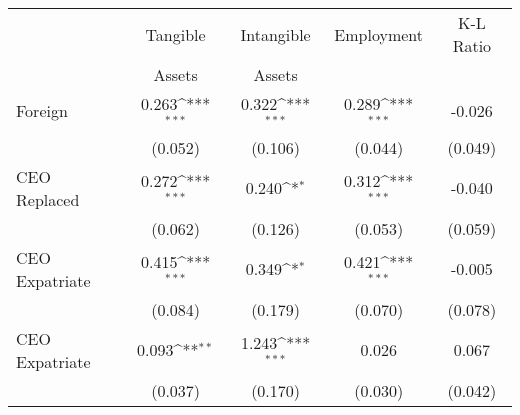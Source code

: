 {
\def\sym#1{\ifmmode^{#1}\else\(^{#1}\)\fi}
\begin{tabular}{l*{4}{c}}
\hline\hline
                    &\multicolumn{1}{c}{Tangible}&\multicolumn{1}{c}{Intangible}&\multicolumn{1}{c}{Employment}&\multicolumn{1}{c}{K-L Ratio}\\
                    &\multicolumn{1}{c}{Assets} &\multicolumn{1}{c}{Assets} &\multicolumn{1}{c}{} &\multicolumn{1}{c}{} \\
\hline
Foreign             &       0.263\sym{***}&       0.322\sym{***}&       0.289\sym{***}&      -0.026         \\
                    &     (0.052)         &     (0.106)         &     (0.044)         &     (0.049)         \\
CEO Replaced        &       0.272\sym{***}&       0.240\sym{*}  &       0.312\sym{***}&      -0.040         \\
                    &     (0.062)         &     (0.126)         &     (0.053)         &     (0.059)         \\
CEO Expatriate      &       0.415\sym{***}&       0.349\sym{*}  &       0.421\sym{***}&      -0.005         \\
                    &     (0.084)         &     (0.179)         &     (0.070)         &     (0.078)         \\ \hline
CEO Expatriate      &       0.093\sym{**} &       1.243\sym{***}&       0.026         &       0.067         \\
                    &     (0.037)         &     (0.170)         &     (0.030)         &     (0.042)         \\
\hline\hline
\end{tabular}
}
